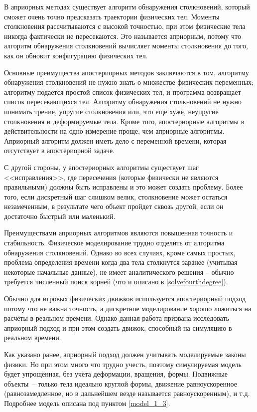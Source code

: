 В априорных методах существует алгоритм обнаружения столкновений, который сможет очень точно предсказать
траектории физических тел. Моменты столкновения рассчитываются с высокой точностью, при этом физические тела
никогда фактически не пересекаются. Это называется априорным, потому что алгоритм обнаружения столкновений
вычисляет моменты столкновения до того, как он обновит конфигурацию физических тел.

Основные преимущества апостериорных методов заключаются в том, алгоритму обнаружения
столкновений не нужно знать о множестве физических переменных; алгоритму подается простой список физических тел,
и программа возвращает список пересекающихся тел. Алгоритму обнаружения столкновений не нужно понимать трение,
упругие столкновения или, что еще хуже, неупругие столкновения и деформируемые тела. Кроме того, апостериорные
алгоритмы в действительности на одно измерение проще, чем априорные алгоритмы. Априорный алгоритм должен иметь дело
с переменной времени, которая отсутствует в апостериорной задаче.

С другой стороны, у апостериорных алгоритмы существует шаг <<исправления>>, где пересечения
(которые физически не являются правильными) должны быть исправлены и это может создать проблему.
Более того, если дискретный шаг слишком велик, столкновение может остаться незамеченным,
в результате чего объект пройдет сквозь другой, если он достаточно быстрый или маленький.

Преимуществами априорных алгоритмов являются повышенная точность и стабильность. Физическое моделирование
трудно отделить от алгоритма обнаружения столкновений. Однако во всех случаях, кроме самых простых,
проблема определения времени когда два тела столкнутся заранее (учитывая некоторые начальные данные),
не имеет аналитического решения -- обычно требуется численный поиск корней (что и описано в \ref{solvefourthdegree}).

Обычно для игровых физических движков используется апостериорный подход потому что не важна точность,
а дискретное моделирование хорошо ложиться на расчёты в реальном времени.
Однако данная работа призвана исследовать априорный подход и при этом создать движок, способный на симуляцию в реальном времени.

Как указано ранее, априорный подход должен учитывать моделируемые законы физики. Но при этом много что трудно учесть, поэтому
симулируемая модель будет упрощённая, без учёта деформации, вращения, формы. Подвижные объекты~-- только тела идеально круглой формы,
движение равноускоренное (равнозамедленное, но в дальнейшем везде называется равноускоренным),
и т.д. Подробнее модель описана под пунктом \ref{model_1_3}.

